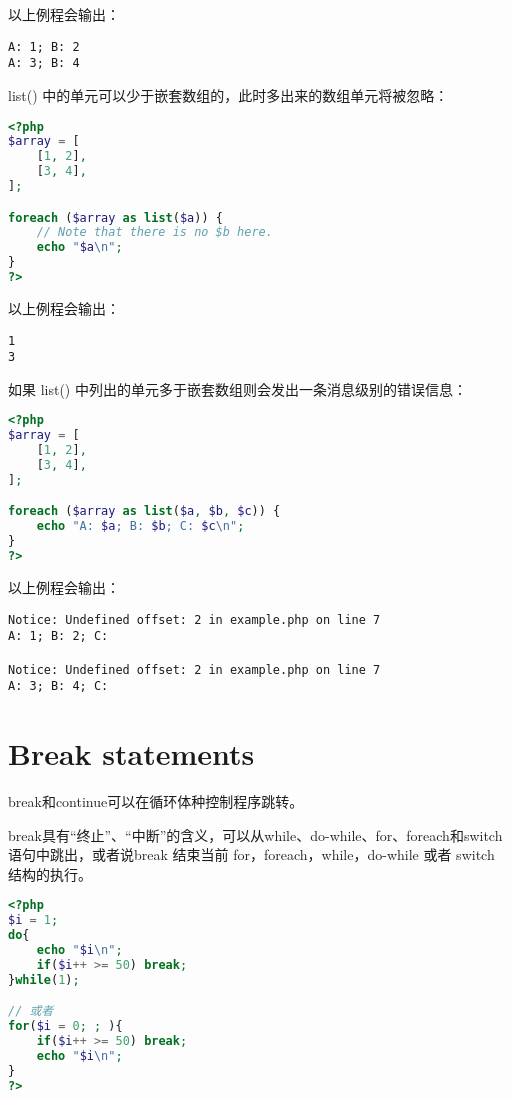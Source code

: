 以上例程会输出：

\begin{verbatim}
A: 1; B: 2
A: 3; B: 4
\end{verbatim}

list() 中的单元可以少于嵌套数组的，此时多出来的数组单元将被忽略：

\begin{lstlisting}[language=PHP]
<?php
$array = [
    [1, 2],
    [3, 4],
];

foreach ($array as list($a)) {
    // Note that there is no $b here.
    echo "$a\n";
}
?>
\end{lstlisting}

以上例程会输出：

\begin{verbatim}
1
3
\end{verbatim}

如果 list() 中列出的单元多于嵌套数组则会发出一条消息级别的错误信息：


\begin{lstlisting}[language=PHP]
<?php
$array = [
    [1, 2],
    [3, 4],
];

foreach ($array as list($a, $b, $c)) {
    echo "A: $a; B: $b; C: $c\n";
}
?>
\end{lstlisting}

以上例程会输出：


\begin{verbatim}
Notice: Undefined offset: 2 in example.php on line 7
A: 1; B: 2; C: 

Notice: Undefined offset: 2 in example.php on line 7
A: 3; B: 4; C: 
\end{verbatim}

\section{Break statements}

break和continue可以在循环体种控制程序跳转。

break具有“终止”、“中断”的含义，可以从while、do-while、for、foreach和switch语句中跳出，或者说break 结束当前 for，foreach，while，do-while 或者 switch 结构的执行。

\begin{lstlisting}[language=PHP]
<?php
$i = 1;
do{
	echo "$i\n";
	if($i++ >= 50) break;
}while(1);

// 或者
for($i = 0; ; ){
	if($i++ >= 50) break;
	echo "$i\n";
}
?>
\end{lstlisting}






